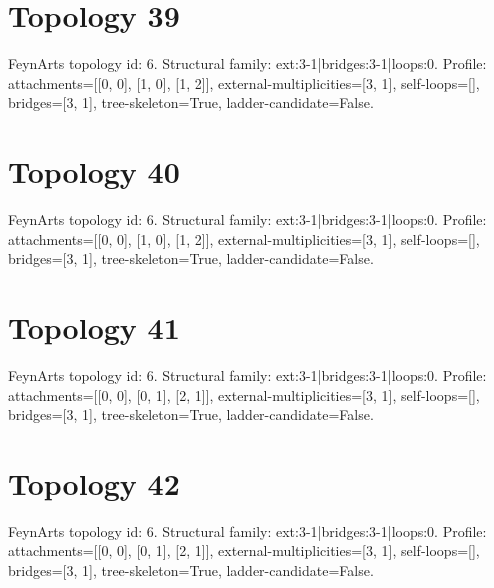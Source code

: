 \documentclass{article}
\begin{document}
\section*{Topology 39}
FeynArts topology id: 6.
Structural family: ext:3-1|bridges:3-1|loops:0.
Profile: attachments=[[0, 0], [1, 0], [1, 2]], external-multiplicities=[3, 1], self-loops=[], bridges=[3, 1], tree-skeleton=True, ladder-candidate=False.
\section*{Topology 40}
FeynArts topology id: 6.
Structural family: ext:3-1|bridges:3-1|loops:0.
Profile: attachments=[[0, 0], [1, 0], [1, 2]], external-multiplicities=[3, 1], self-loops=[], bridges=[3, 1], tree-skeleton=True, ladder-candidate=False.
\section*{Topology 41}
FeynArts topology id: 6.
Structural family: ext:3-1|bridges:3-1|loops:0.
Profile: attachments=[[0, 0], [0, 1], [2, 1]], external-multiplicities=[3, 1], self-loops=[], bridges=[3, 1], tree-skeleton=True, ladder-candidate=False.
\section*{Topology 42}
FeynArts topology id: 6.
Structural family: ext:3-1|bridges:3-1|loops:0.
Profile: attachments=[[0, 0], [0, 1], [2, 1]], external-multiplicities=[3, 1], self-loops=[], bridges=[3, 1], tree-skeleton=True, ladder-candidate=False.
\end{document}
